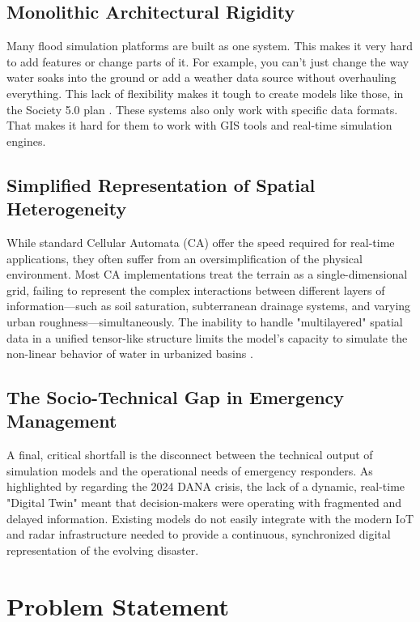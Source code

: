 \subsection{Monolithic Architectural Rigidity}

Many flood simulation platforms are built as one system. This makes it very hard to add features or change parts of it. For example, 
you can't just change the way water soaks into the ground or add a weather data source without overhauling everything. This lack of 
flexibility makes it tough to create models like those, in the Society 5.0 plan \parencite{FonsecaiCasas2026}. These systems also only work with specific data formats.
That makes it hard for them to work with GIS tools and real-time simulation engines.


\subsection{Simplified Representation of Spatial Heterogeneity}

While standard Cellular Automata (CA) offer the speed required for real-time applications, they often suffer from an 
oversimplification of the physical environment. Most CA implementations treat the terrain as a single-dimensional grid, 
failing to represent the complex interactions between different layers of information—such as soil saturation, 
subterranean drainage systems, and varying urban roughness—simultaneously. The inability to handle "multilayered" spatial 
data in a unified tensor-like structure limits the model's capacity to simulate the non-linear behavior of water in 
urbanized basins \parencite{Fonseca2011}.


\subsection{The Socio-Technical Gap in Emergency Management}

A final, critical shortfall is the disconnect between the technical output of simulation models and the operational needs 
of emergency responders. As highlighted by regarding the 2024 DANA crisis, the lack of a dynamic, real-time 
"Digital Twin" meant that decision-makers were operating with fragmented and delayed information. Existing models do not 
easily integrate with the modern IoT and radar infrastructure needed to provide a continuous, synchronized digital 
representation of the evolving disaster.


\section{Problem Statement}

